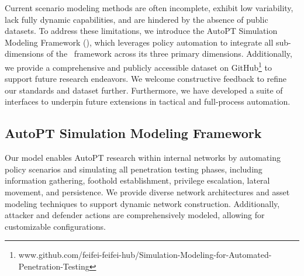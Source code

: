 Current scenario modeling methods are often incomplete, exhibit low variability, lack fully dynamic capabilities, and are hindered by the absence of public datasets. To address these limitations, we introduce the AutoPT Simulation Modeling Framework (\modelsim), which leverages policy automation to integrate all sub-dimensions of the \modelcla~framework across its three primary dimensions. Additionally, we provide a comprehensive and publicly accessible dataset on GitHub\footnote{www.github.com/feifei-feifei-hub/Simulation-Modeling-for-Automated-Penetration-Testing} to support future research endeavors. We welcome constructive feedback to refine our standards and dataset further. Furthermore, we have developed a suite of interfaces to underpin future extensions in tactical and full-process automation.



\subsection{AutoPT Simulation Modeling Framework}
Our model enables AutoPT research within internal networks by automating policy scenarios and simulating all penetration testing phases, including information gathering, foothold establishment, privilege escalation, lateral movement, and persistence. We provide diverse network architectures and asset modeling techniques to support dynamic network construction. Additionally, attacker and defender actions are comprehensively modeled, allowing for customizable configurations.

